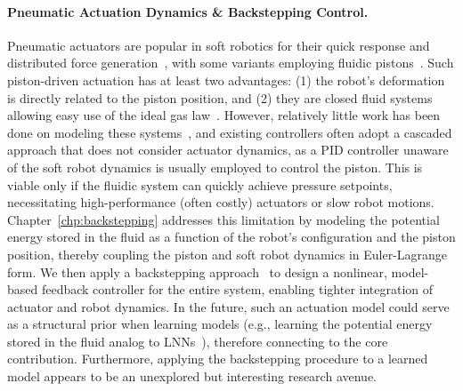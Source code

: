 \paragraph{Pneumatic Actuation Dynamics \& Backstepping Control.}
Pneumatic actuators are popular in soft robotics for their quick response and distributed force generation~\cite{marchese2015recipe, zaidi2021actuation}, with some variants employing fluidic pistons~\cite{marchese2014design, marchese2016design, parlikar2024concept, malas2024novel}. Such piston-driven actuation has at least two advantages: (1) the robot’s deformation is directly related to the piston position, and (2) they are closed fluid systems allowing easy use of the ideal gas law~\cite{marchese2016design}. However, relatively little work has been done on modeling these systems~\cite{marchese2014design, xavier2020modelling}, and existing controllers often adopt a cascaded approach that does not consider actuator dynamics, as a PID controller unaware of the soft robot dynamics is usually employed to control the piston. This is viable only if the fluidic system can quickly achieve pressure setpoints, necessitating high-performance (often costly) actuators or slow robot motions.
%
Chapter~\ref{chp:backstepping} addresses this limitation by modeling the potential energy stored in the fluid as a function of the robot’s configuration and the piston position, thereby coupling the piston and soft robot dynamics in Euler-Lagrange form. We then apply a backstepping approach~\cite{kokotovic1992joy, lozano1992adaptive, khalil2002nonlinear} to design a nonlinear, model-based feedback controller for the entire system, enabling tighter integration of actuator and robot dynamics.
In the future, such an actuation model could serve as a structural prior when learning models (e.g., learning the potential energy stored in the fluid analog to \glspl{LNN}~\cite{lutter2019deep}), therefore connecting to the core contribution. Furthermore, applying the backstepping procedure to a learned model appears to be an unexplored but interesting research avenue.


